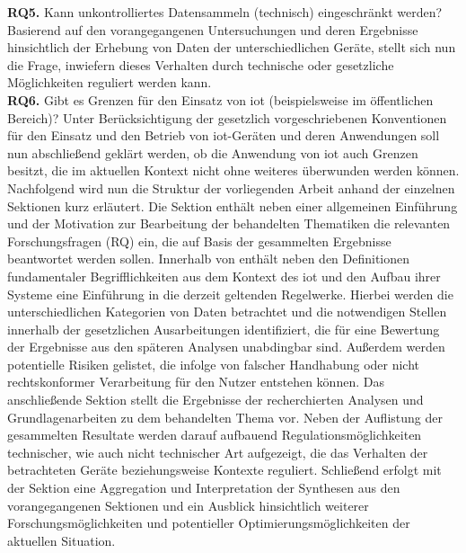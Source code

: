 \textbf{RQ5.} Kann unkontrolliertes Datensammeln (technisch) eingeschränkt werden? Basierend auf den vorangegangenen Untersuchungen und deren Ergebnisse hinsichtlich der Erhebung von Daten der unterschiedlichen Geräte, stellt sich nun die Frage, inwiefern dieses Verhalten durch technische oder gesetzliche Möglichkeiten reguliert werden kann.\\
\textbf{RQ6.} Gibt es Grenzen für den Einsatz von \ac{iot} (beispielsweise im öffentlichen Bereich)? Unter Berücksichtigung der gesetzlich vorgeschriebenen Konventionen für den Einsatz und den Betrieb von \ac{iot}-Geräten und deren Anwendungen soll nun abschließend geklärt werden, ob die Anwendung von \ac{iot} auch Grenzen besitzt, die im aktuellen Kontext nicht ohne weiteres überwunden werden können. \\


\noindent Nachfolgend wird nun die Struktur der vorliegenden Arbeit anhand der einzelnen Sektionen kurz erläutert. Die Sektion  enthält neben einer allgemeinen Einführung und der Motivation zur Bearbeitung der behandelten Thematiken die relevanten Forschungsfragen (RQ) ein, die auf Basis der gesammelten Ergebnisse beantwortet werden sollen. Innerhalb von  enthält neben den Definitionen fundamentaler Begrifflichkeiten aus dem Kontext des \ac{iot} und den Aufbau ihrer Systeme eine Einführung in die derzeit geltenden Regelwerke. Hierbei werden die unterschiedlichen Kategorien von Daten betrachtet und die notwendigen Stellen innerhalb der gesetzlichen Ausarbeitungen identifiziert, die für eine Bewertung der Ergebnisse aus den späteren Analysen unabdingbar sind. Außerdem werden potentielle Risiken gelistet, die infolge von falscher Handhabung oder nicht rechtskonformer Verarbeitung für den Nutzer entstehen können. Das anschließende Sektion  stellt die Ergebnisse der recherchierten Analysen und Grundlagenarbeiten zu dem behandelten Thema vor. Neben der Auflistung der gesammelten Resultate werden darauf aufbauend Regulationsmöglichkeiten technischer, wie auch nicht technischer Art aufgezeigt, die das Verhalten der betrachteten Geräte beziehungsweise Kontexte reguliert. Schließend erfolgt mit der Sektion  eine Aggregation und Interpretation der Synthesen aus den vorangegangenen Sektionen und ein Ausblick hinsichtlich weiterer Forschungsmöglichkeiten und potentieller Optimierungsmöglichkeiten der aktuellen Situation.

